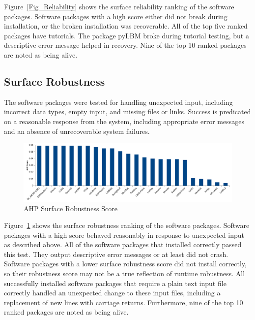 \documentclass[final, 3p, times, authoryear]{elsarticle}
\begin{document}
Figure~\ref{Fig_Reliability} shows the surface reliability ranking of the
software packages. Software packages with a high score either did not break
during installation, or the broken installation was recoverable. All of the top
five ranked packages have tutorials. The package pyLBM broke during tutorial
testing, but a descriptive error message helped in recovery. Nine of the top 10
ranked packages are noted as being alive. 

\subsection{Surface Robustness}

The software packages were tested for handling unexpected input, including
incorrect data types, empty input, and missing files or links. Success is
predicated on a reasonable response from the system, including appropriate error
messages and an absence of unrecoverable system failures. 

\begin{figure}[h!]
	\begin{center}
		\includegraphics[width=1.0\textwidth]{./figures/robustness_chart.pdf}
		\caption{AHP Surface Robustness Score}
		\label{Fig_Robustness}
	\end{center}
\end{figure}

Figure~\ref{Fig_Robustness} shows the surface robustness ranking of the software
packages. Software packages with a high score behaved reasonably in response to
unexpected input as described above. All of the software packages that installed
correctly passed this test. They output descriptive error messages or at least
did not crash. Software packages with a lower surface robustness score did not
install correctly, so their robustness score may not be a true reflection of
runtime robustness. All successfully installed software packages that require a
plain text input file correctly handled an unexpected change to these input
files, including a replacement of new lines with carriage returns. Furthermore,
nine of the top 10 ranked packages are noted as being alive.
\end{document}
